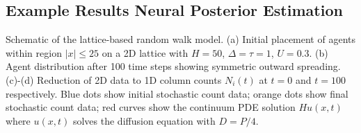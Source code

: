 \documentclass{article}
\providecommand{\DIFaddtex}[1]{{\protect\color{blue} \sf #1}} %
\providecommand{\DIFdeltex}[1]{{\protect\color{red} \scriptsize #1}} %
\providecommand{\DIFaddbegin}{} %
\providecommand{\DIFaddend}{} %
\providecommand{\DIFdelbegin}{} %
\providecommand{\DIFdelend}{} %
\providecommand{\DIFdelFL}[1]{\DIFdel{#1}} %
\providecommand{\DIFadd}[1]{\texorpdfstring{\DIFaddtex{#1}}{#1}} %
\providecommand{\DIFdel}[1]{\texorpdfstring{\DIFdeltex{#1}}{}} %
\newcommand{\DIFscaledelfig}{0.5}
\newlength{\DIFdelgraphicswidth} %
\newlength{\DIFdelgraphicsheight} %
\newcommand{\DIFaddincludegraphics}[2][]{{\color{blue}\fbox{\DIFOincludegraphics[#1]{#2}}}} %
\newcommand{\DIFdelincludegraphics}[2][]{%
\sbox{\DIFdelgraphicsbox}{\DIFOincludegraphics[#1]{#2}}%
\settoboxwidth{\DIFdelgraphicswidth}{\DIFdelgraphicsbox} %
\settoboxtotalheight{\DIFdelgraphicsheight}{\DIFdelgraphicsbox} %
\scalebox{\DIFscaledelfig}{%
\parbox[b]{\DIFdelgraphicswidth}{\usebox{\DIFdelgraphicsbox}\\[-\baselineskip] \rule{\DIFdelgraphicswidth}{0em}}\llap{\resizebox{\DIFdelgraphicswidth}{\DIFdelgraphicsheight}{%
\setlength{\unitlength}{\DIFdelgraphicswidth}%
\begin{picture}(1,1)%
\thicklines\linethickness{2pt} %
{\color[rgb]{1,0,0}\put(0,0){\framebox(1,1){}}}%
{\color[rgb]{1,0,0}\put(0,0){\line( 1,1){1}}}%
{\color[rgb]{1,0,0}\put(0,1){\line(1,-1){1}}}%
\end{picture}%
}\hspace*{3pt}}} %
} %
\DeclareRobustCommand{\DIFaddbegin}{\DIFOaddbegin \let\includegraphics\DIFaddincludegraphics} %
\DeclareRobustCommand{\DIFaddend}{\DIFOaddend \let\includegraphics\DIFOincludegraphics} %
\DeclareRobustCommand{\DIFdelbegin}{\DIFOdelbegin \let\includegraphics\DIFdelincludegraphics} %
\DeclareRobustCommand{\DIFdelend}{\DIFOaddend \let\includegraphics\DIFOincludegraphics} %
\begin{document}
\DIFdelbegin %



\DIFdelend \subsection{\DIFdelbegin \DIFdel{Example Results}\DIFdelend \DIFaddbegin \DIFadd{Neural Posterior Estimation}\DIFaddend }\DIFdelbegin %
{%
\DIFdelFL{Schematic of the lattice-based random walk model. (a) Initial placement of agents within region $|x| \leq 25$ on a 2D lattice with $H=50$, $\Delta=\tau=1$, $U=0.3$. (b) Agent distribution after 100 time steps showing symmetric outward spreading. (c)-(d) Reduction of 2D data to 1D column counts $N_i(t)$ at $t=0$ and $t=100$ respectively. Blue dots show initial stochastic count data; orange dots show final stochastic count data; red curves show the continuum PDE solution $Hu(x,t)$ where $u(x,t)$ solves the diffusion equation with $D=P/4$.}}
\end{document}
